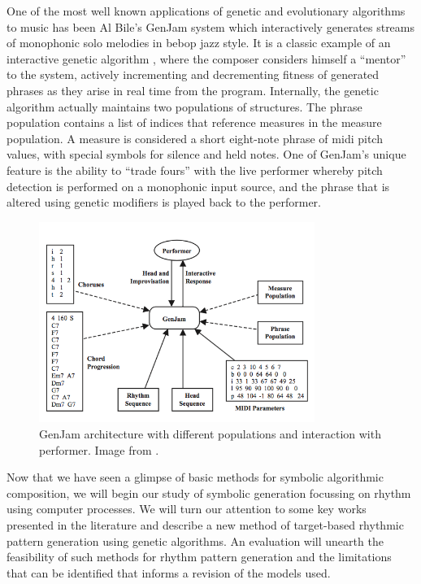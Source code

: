 One of the most well known applications of genetic and evolutionary algorithms to music has been Al Bile’s GenJam system \citep{Biles1994,Biles2002,  Biles2003, Biles2007} which interactively generates streams of monophonic solo melodies in bebop jazz style.  It is a classic example of an interactive genetic algorithm , where the composer considers himself a “mentor” to the system, actively incrementing and decrementing fitness of generated phrases as they arise in real time from the program. Internally, the genetic algorithm actually maintains two populations of structures. The phrase population contains a list of indices that reference measures in the measure population. A measure is considered a short eight-note phrase of \acrshort{midi} pitch values, with special symbols for silence and held notes.  One of GenJam's unique feature is the ability to “trade fours” with the live performer whereby pitch detection is performed on a monophonic input source, and the phrase that is altered using genetic modifiers is played back to the performer.

\begin{figure}
	\begin{center}
		\includegraphics[width=0.8\textwidth]{ch03_symbolic/figures/genjam.png}
	\end{center}
	\caption[GenJam Interactive Architecture]{GenJam architecture with different populations and interaction with performer. Image from \cite{Miranda2007a}.}
	\label{fig:genjam}
\end{figure}

Now that we have seen a glimpse of basic methods for symbolic algorithmic composition, we will begin our study of symbolic generation focussing on rhythm using computer processes. We will turn our attention to some key works presented in the literature and describe a new method of target-based rhythmic pattern generation using genetic algorithms. An evaluation will unearth the feasibility of such methods for rhythm pattern generation and the limitations that can be identified that informs a revision of the models used.\

